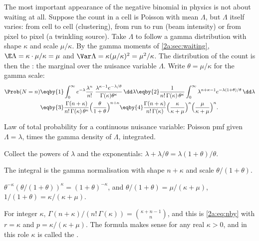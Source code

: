 The most important appearance of the negative binomial in physics is not about waiting at all. Suppose the count in a cell is Poisson with mean $\Lambda$, but $\Lambda$ itself varies: from cell to cell (clustering), from run to run (beam intensity) or from pixel to pixel (a twinkling source). Take $\Lambda$ to follow a gamma distribution with shape $\kappa$ and scale $\mu/\kappa$. By the gamma moments of \cref{2a:sec:waiting}, $\E\Lambda=\kappa\cdot\mu/\kappa=\mu$ and $\Var\Lambda=\kappa(\mu/\kappa)^2=\mu^2/\kappa$. The distribution of the count is then the : the marginal over the nuisance variable $\Lambda$. Write $\theta=\mu/\kappa$ for the gamma scale:
\begin{align*}
  \Prob(N=n)
  &\eqby{1} \int_0^\infty e^{-\lambda}\frac{\lambda^n}{n!}\;\frac{\lambda^{\kappa-1}e^{-\lambda/\theta}}{\Gamma(\kappa)\theta^\kappa}\,\dd\lambda
  \eqby{2} \frac{1}{n!\,\Gamma(\kappa)\,\theta^\kappa}\int_0^\infty\lambda^{n+\kappa-1}e^{-\lambda(1+\theta)/\theta}\,\dd\lambda\\
  &\eqby{3} \frac{\Gamma(n+\kappa)}{n!\,\Gamma(\kappa)\,\theta^\kappa}\Bigl(\frac{\theta}{1+\theta}\Bigr)^{n+\kappa}
  \eqby{4} \frac{\Gamma(n+\kappa)}{n!\,\Gamma(\kappa)}\Bigl(\frac{\kappa}{\kappa+\mu}\Bigr)^{\kappa}\Bigl(\frac{\mu}{\kappa+\mu}\Bigr)^{n}.
\end{align*}
\begin{explain}
  \item Law of total probability for a continuous nuisance variable: Poisson pmf given $\Lambda=\lambda$, times the gamma density of $\Lambda$, integrated.
  \item Collect the powers of $\lambda$ and the exponentials: $\lambda+\lambda/\theta=\lambda(1+\theta)/\theta$.
  \item The integral is the gamma normalisation with shape $n+\kappa$ and scale $\theta/(1+\theta)$.
  \item $\theta^{-\kappa}(\theta/(1+\theta))^{\kappa}=(1+\theta)^{-\kappa}$, and $\theta/(1+\theta)=\mu/(\kappa+\mu)$, $1/(1+\theta)=\kappa/(\kappa+\mu)$.
\end{explain}
For integer $\kappa$, $\Gamma(n+\kappa)/(n!\,\Gamma(\kappa))=\binom{\kappa+n-1}{n}$, and this is \eqref{2a:eq:nby} with $r=\kappa$ and $p=\kappa/(\kappa+\mu)$. The formula makes sense for any real $\kappa>0$, and in this role $\kappa$ is called the  .

